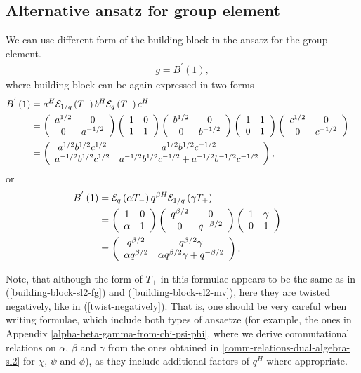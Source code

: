 \documentclass{article}
\newcommand{\lb}{\left (}
\newcommand{\rb}{\right )}
\newcommand{\lsb}{\left [}
\newcommand{\rsb}{\right ]}
\newcommand{\be}{\begin{eqnarray}}
\newcommand{\ee}{\end{eqnarray}}
\newcommand {\?}{\textit{???}}
\newcommand{\me}[0]{\mathcal{E}}
\newcommand{\Bp}[1]{B^{'}\lb #1 \rb}
\newcommand{\matd}[4]{\lb \begin{array}{cc}
#1 & #2 \\ #3 & #4
\end{array} \rb}
\newcommand{\delabel}[1]{(\ref{#1})}
\newcommand{\Honed}[1]{\lb \begin{array}{ccc}
#1^{1/2} & 0 \\ 0 & #1^{-1/2}
\end{array} \rb}
\newcommand{\Eoned}[1]{\lb \begin{array}{cc}
1 & #1 \\ 0 & 1
\end{array} \rb}
\newcommand{\Foned}[1]{\lb \begin{array}{cc}
1 & 0 \\ #1 & 1
\end{array} \rb}
\begin{document}



\subsection{Alternative ansatz for group element}

We can use different form of the building block in the ansatz for the group element.
\be
\label{quantum-group-element-alt-sl2}
g = \Bp{1},
\ee
where building block can be again expressed in two forms
\begin{align}
\label{building-block-alt-sl2-fg}
\Bp{1} & = a^H \me_{1/q} \lb T_-\rb b^H \me_{q} \lb T_+ \rb c^H & \\
& = \Honed{a} \Foned{1} \Honed{b} \Eoned{1} \Honed{c} & \notag \\
& = \matd{a^{1/2}b^{1/2}c^{1/2}}{a^{1/2}b^{1/2}c^{-1/2}}
{a^{-1/2}b^{1/2}c^{1/2}}{a^{-1/2}b^{1/2}c^{-1/2} + a^{-1/2}b^{-1/2}c^{-1/2}} \notag,
\end{align}
or
\begin{align}
\label{building-block-alt-sl2-mv}
\Bp{1} & = \me_q \lb \alpha T_- \rb q^{\beta H} \me_{1/q} \lb \gamma T_+ \rb & \\
& = \Foned{\alpha} \matd{q^{\beta/2}}{0}{0}{q^{-\beta/2}} \Eoned{\gamma}
\\ \notag
& = \matd{q^{\beta/2}}{q^{\beta/2}\gamma}{\alpha q^{\beta/2}}{\alpha q^{\beta/2}\gamma  + q^{-\beta/2}} \notag.
\end{align}

Note, that although the form of $T_\pm$ in this formulae appears to be the same as in
\delabel{building-block-sl2-fg} and \delabel{building-block-sl2-mv}, here they are twisted negatively, like
in \delabel{twist-negatively}. That is, one should be very careful when writing formulae, which include
both types of ansaetze (for example, the ones in Appendix \ref{alpha-beta-gamma-from-chi-psi-phi}, where
we derive commutational relations on $\alpha$, $\beta$ and $\gamma$ from the ones obtained in
\ref{comm-relations-dual-algebra-sl2} for
$\chi$, $\psi$ and $\phi$), as they include additional factors of $q^H$ where appropriate.
\end{document}
